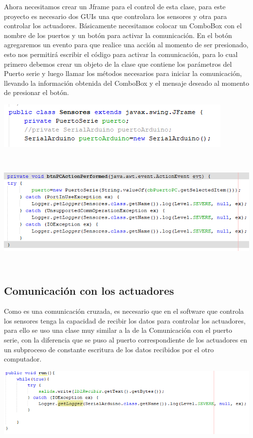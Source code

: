 \documentclass[12pt]{report}
\begin{document}
Ahora necesitamos crear un Jframe para el control de esta clase, para este proyecto es necesario dos GUIs una que controlara los sensores y otra para controlar los actuadores.
Básicamente necesitamos colocar un ComboBox con el nombre de los puertos y un botón para activar la comunicación.
En el botón agregaremos un evento para que realice una acción al momento de ser presionado, esto nos permitirá escribir el código para activar la comunicación, para lo cual primero debemos crear un objeto de la clase que contiene los parámetros del Puerto serie y luego llamar los métodos necesarios para iniciar la comunicación, llevando la información obtenida del ComboBox y el mensaje deseado al momento de presionar el botón.
\begin{center}
\includegraphics[scale=0.8]{Documento/Figuras/6.PNG}
\begin{scriptsize}
\\ 
\end{scriptsize}
\end{center}
\begin{center}
\includegraphics[scale=0.8]{Documento/Figuras/7.PNG}
\begin{scriptsize}
\\ 
\end{scriptsize}
\end{center}
\subsection{Comunicación con los actuadores}
Como es una comunicación cruzada, es necesario que en el software que controla los sensores tenga la capacidad de recibir los datos para controlar los actuadores, para ello se uso una clase muy similar a la de la Comunicación con el puerto serie, con la diferencia que se puso al puerto correspondiente de los actuadores en un subproceso de constante escritura de los datos recibidos por el otro computador.
\begin{center}
\includegraphics[scale=0.8]{Documento/Figuras/8.PNG}
\begin{scriptsize}
\\ 
\end{scriptsize}
\end{center}
\end{document}
